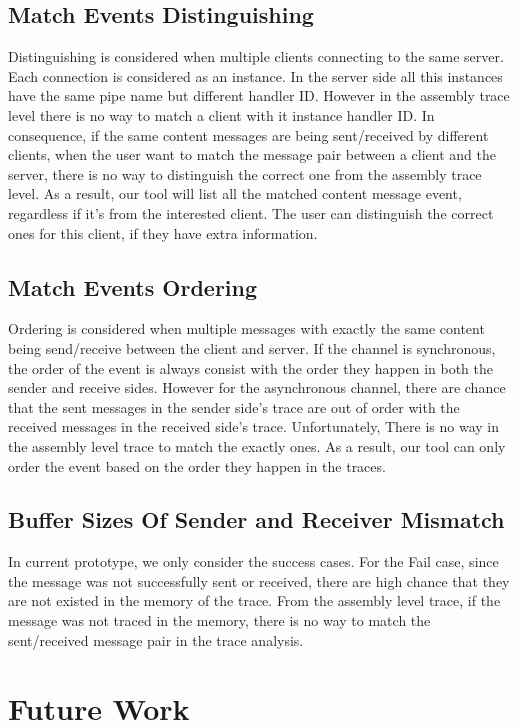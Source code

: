 \documentclass[paper=a4, fontsize=11pt]{scrartcl}
\numberwithin{equation}{section}		%
\numberwithin{figure}{section}			%
\numberwithin{table}{section}				%
\begin{document}
\subsection{Match Events Distinguishing}
Distinguishing is considered when multiple clients connecting to the same server. Each connection is considered as an instance. In the server side all this instances have the same pipe name but different handler ID. However in the assembly trace level there is no way to match a client with it instance handler ID. In consequence, if the same content messages are being sent/received by different clients, when the user want to match the message pair between a client and the server, there is no way to distinguish the correct one from the assembly trace level. As a result, our tool will list all the matched content message event, regardless if it's from the interested client. The user can distinguish the correct ones for this client, if they have extra information.

\subsection{Match Events Ordering}
Ordering is considered when multiple messages with exactly the same content being send/receive between the client and server. If the channel is synchronous, the order of the event is always consist with the order they happen in both the sender and receive sides. However for the asynchronous channel, there are chance that the sent messages in the sender side's trace are out of order with the received messages in the received side's trace. Unfortunately, There is no way in the assembly level trace to match the exactly ones. As a result, our tool can only order the event based on the order they happen in the traces.

\subsection{Buffer Sizes Of Sender and Receiver Mismatch}
In current prototype, we only consider the success cases. For the Fail case, since the message was not successfully sent or received, there are high chance that they are not existed in the memory of the trace. From the assembly level trace, if the message was not traced in the memory, there is no way to match the sent/received message pair in the trace analysis. 

\section{Future Work}



 


\end{document}
